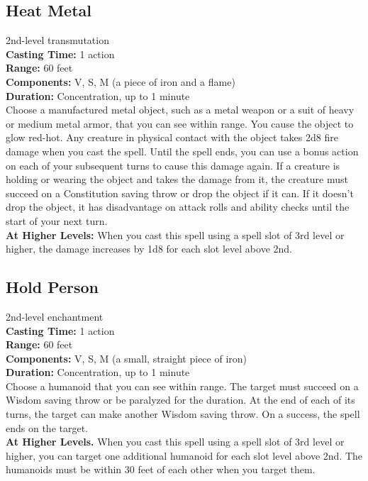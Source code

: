 \documentclass[11pt, A4paper, english]{article}
\begin{document}
		\subsection{Heat Metal}
2nd-level transmutation \\
\textbf{Casting Time:} 1 action \\
\textbf{Range:} 60 feet \\
\textbf{Components:} V, S, M (a piece of iron and a flame) \\
\textbf{Duration:} Concentration, up to 1 minute \\
Choose a manufactured metal object, such as a metal weapon or a suit of heavy or medium metal armor, that you can see within range. You cause the object to glow red-hot. Any creature in physical contact with the object takes 2d8 fire damage when you cast the spell. Until the spell ends, you can use a bonus action on each of your subsequent turns to cause this damage again. If a creature is holding or wearing the object and takes the damage from it, the creature must succeed on a Constitution saving throw or drop the object if it can. If it doesn’t drop the object, it has disadvantage on attack rolls and ability checks until the start of your next turn. \\
\textbf{At Higher Levels:} When you cast this spell using a spell slot of 3rd level or higher, the damage increases by 1d8 for each slot level above 2nd.

		\subsection{Hold Person}
2nd-level enchantment \\
\textbf{Casting Time:} 1 action \\
\textbf{Range:} 60 feet \\
\textbf{Components:} V, S, M (a small, straight piece of iron) \\
\textbf{Duration:} Concentration, up to 1 minute \\
Choose a humanoid that you can see within range. The target must succeed on a Wisdom saving throw or be paralyzed for the duration. At the end of each of its turns, the target can make another Wisdom saving throw. On a success, the spell ends on the target. \\
\textbf{At Higher Levels.} When you cast this spell using a spell slot of 3rd level or higher, you can target one additional humanoid for each slot level above 2nd. The humanoids must be within 30 feet of each other when you target them.
\end{document}
